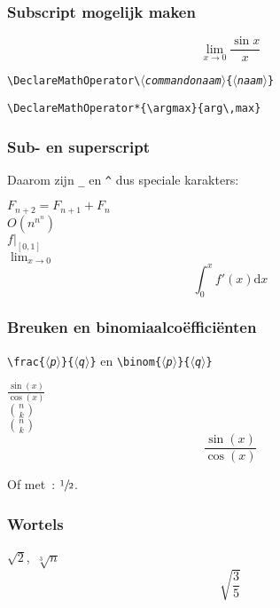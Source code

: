 \begin{frame}[fragile]
  \frametitle{Subscript mogelijk maken}

  \begin{LTXexample}
\begin{equation}
  \lim_{x\rightarrow 0}
  \frac{\sin x}{x}
\end{equation}
  \end{LTXexample}

  \texttt{\textbackslash DeclareMathOperator\textbackslash\textsl{$\langle$commandonaam$\rangle$}\{\textsl{$\langle$naam$\rangle$}\}}
  \begin{verbatim}
\DeclareMathOperator*{\argmax}{arg\,max} 
  \end{verbatim}
\end{frame}

\begin{frame}[fragile]
  \frametitle{Sub- en superscript}

  Daarom zijn \verb|_| en \verb|^| dus speciale karakters:
  \begin{LTXexample}
$F_{n+2}=F_{n+1}+F_n$ \\
$O(n^{n^n})$ \\
$f|_{[0,1]}$ \\
$\lim_{x\rightarrow 0}$
\begin{equation}
  \int_0^x f'(x)\mathrm{d}x
\end{equation}
  \end{LTXexample}
\end{frame}

\begin{frame}[fragile]
  \frametitle{Breuken en binomiaalco\"effici\"enten}

  \texttt{\textbackslash frac\{$\langle$\textsl{p}$\rangle$\}\{$\langle$\textsl{q}$\rangle$\}} en \texttt{\textbackslash binom\{$\langle$\textsl{p}$\rangle$\}\{$\langle$\textsl{q}$\rangle$\}}

  \begin{LTXexample}
$\frac{\sin(x)}{\cos(x)}$ \\
$\binom{n}{k}$ \\
$\displaystyle\binom{n}{k}$
\begin{equation}
  \frac{\sin(x)}{\cos(x)}
\end{equation}
  \end{LTXexample}
  Of met~: $\sfrac{1}{2}$.
\end{frame}

\begin{frame}[fragile]
  \frametitle{Wortels}

  \begin{LTXexample}
$\sqrt{2}$,~$\sqrt[3]{n}$
\begin{equation}
  \sqrt{\frac{3}{5}}
\end{equation}
  \end{LTXexample}
\end{frame}

